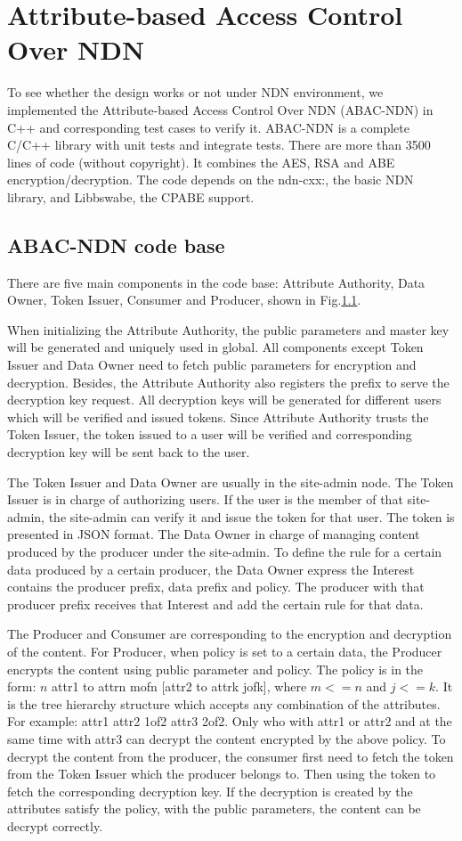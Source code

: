 \section{Attribute-based Access Control Over NDN}

To see whether the design works or not under NDN environment, we implemented the Attribute-based Access Control Over NDN (ABAC-NDN) in C++ and corresponding test cases to verify it. ABAC-NDN is a complete C/C++ library with unit tests and integrate tests. There are more than 3500 lines of code (without copyright). It combines the AES, RSA and ABE encryption/decryption. The code depends on the ndn-cxx:, the basic NDN library, and Libbswabe, the CPABE support.

\subsection{ABAC-NDN code base}

There are five main components in the code base: Attribute Authority, Data Owner, Token Issuer, Consumer and Producer, shown in Fig.\ref{}.

When initializing the Attribute Authority, the public parameters and master key will be generated and uniquely used in global. All components except Token Issuer and Data Owner need to fetch public parameters for encryption and decryption. Besides, the Attribute Authority also registers the prefix to serve the decryption key request. All decryption keys will be generated for different users which will be verified and issued tokens. Since Attribute Authority trusts the Token Issuer, the token issued to a user will be verified and corresponding decryption key will be sent back to the user.

The Token Issuer and Data Owner are usually in the site-admin node. The Token Issuer is in charge of authorizing users. If the user is the member of that site-admin, the site-admin can verify it and issue the token for that user. The token is presented in JSON format. The Data Owner in charge of managing content produced by the producer under the site-admin. To define the rule for a certain data produced by a certain producer, the Data Owner express the Interest contains the producer prefix, data prefix and policy. The producer with that producer prefix receives that Interest and add the certain rule for that data.

The Producer and Consumer are corresponding to the encryption and decryption of the content. For Producer, when policy is set to a certain data, the Producer encrypts the content using public parameter and policy. The policy is in the form: $n$ attr1 to attrn mofn [attr2 to attrk jofk], where $m<=n$ and $j<=k$. It is the tree hierarchy structure which accepts any combination of the attributes. For example: attr1 attr2 1of2 attr3 2of2. Only who with attr1 or attr2 and at the same time with attr3 can decrypt the content encrypted by the above policy. To decrypt the content from the producer, the consumer first need to fetch the token from the Token Issuer which the producer belongs to. Then using the token to fetch the corresponding decryption key. If the decryption is created by the attributes satisfy the policy, with the public parameters, the content can be decrypt correctly.

